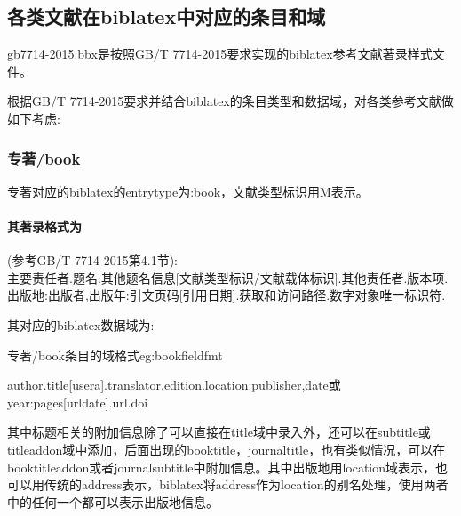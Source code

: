 
\subsection{各类文献在biblatex中对应的条目和域}\label{sec:numeric:data}
gb7714-2015.bbx是按照GB/T 7714-2015要求实现的biblatex参考文献著录样式文件。

根据GB/T 7714-2015要求并结合biblatex的条目类型和数据域，对各类参考文献做如下考虑:
\subsubsection{专著/book}
\begin{refentry}{}{}
专著对应的biblatex的entrytype为:book，文献类型标识用M表示。

\paragraph{其著录格式为}(参考GB/T 7714-2015第4.1节):\\
主要责任者.题名:其他题名信息[文献类型标识/文献载体标识].其他责任者.版本项.出版地:出版者,出版年:引文页码[引用日期].获取和访问路径.数字对象唯一标识符.
\end{refentry}

其对应的biblatex数据域为:
\begin{example}{专著/book条目的域格式}{eg:bookfieldfmt}
\begin{texlist}
author.title[usera].translator.edition.location:publisher,date或year:pages[urldate].url.doi
\end{texlist}
\end{example}

其中标题相关的附加信息除了可以直接在title域中录入外，还可以在subtitle或titleaddon域中添加，后面出现的booktitle，journaltitle，也有类似情况，可以在booktitleaddon或者journalsubtitle中附加信息。其中出版地用location域表示，也可以用传统的address表示，biblatex将address作为location的别名处理，使用两者中的任何一个都可以表示出版地信息。


